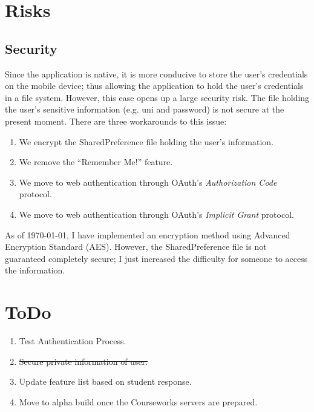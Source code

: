 \documentclass{article}
\begin{document}
\section{Risks}
 \subsection{Security}
Since the application is native, it is more conducive to store the user's credentials on the mobile device; thus allowing the application to hold the user's credentials in a file system. However, this ease opens up a large security risk. The file holding the user's sensitive information (e.g. uni and password) is not secure at the present moment. There are three workarounds to this issue:
  \begin{enumerate}
   \item We encrypt the SharedPreference file holding the user's information.
   \item We remove the ``Remember Me!'' feature.
   \item We move to web authentication through OAuth's \emph{Authorization Code} protocol.
   \item We move to web authentication through OAuth's \emph{Implicit Grant} protocol.
  \end{enumerate}
As of \today, I have implemented an encryption method using Advanced Encryption Standard (AES). However, the SharedPreference file is not guaranteed completely secure; I just increased the difficulty for someone to access the information.

\section{ToDo}
 \begin{enumerate}
  \item Test Authentication Process.
  \item \st{Secure private information of user.}
  \item Update feature list based on student response.
  \item Move to alpha build once the Courseworks servers are prepared.
 \end{enumerate}
\end{document}
